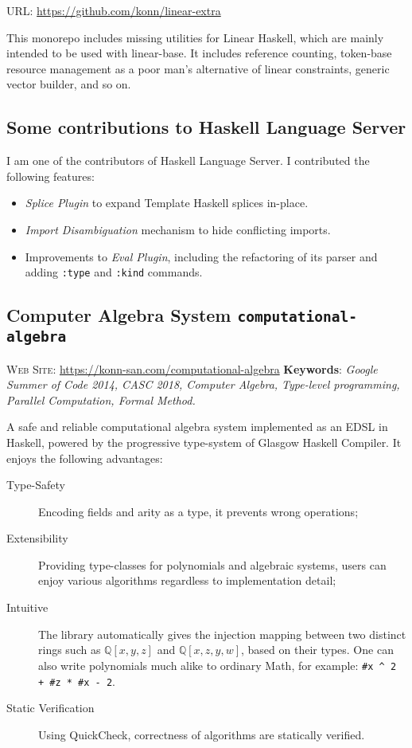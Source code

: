 \documentclass{moderncv}
\begin{document}
URL: \url{https://github.com/konn/linear-extra}

This monorepo includes missing utilities for Linear Haskell, which are mainly intended to be used with linear-base.
It includes reference counting, token-base resource management as a poor man's alternative of linear constraints, generic vector builder, and so on.

\subsection{Some contributions to Haskell Language Server}

I am one of the contributors of Haskell Language Server.
I contributed the following features:

\begin{itemize}
  \item \emph{Splice Plugin} to expand Template Haskell splices in-place.
  \item \emph{Import Disambiguation} mechanism to hide conflicting imports.
  \item Improvements to \emph{Eval Plugin}, including the refactoring of its parser and adding \texttt{:type} and \texttt{:kind} commands.
\end{itemize}

\subsection{Computer Algebra System \texttt{computational-algebra}}
 \vspace{-.5em}\noindent
 \textsc{Web Site}: \url{https://konn-san.com/computational-algebra}\newline
 \textbf{Keywords}: \emph{Google Summer of Code 2014, CASC 2018, Computer Algebra, Type-level programming, Parallel Computation, Formal Method.}

 \vspace{.5em}
 A safe and reliable computational algebra system implemented as an EDSL in Haskell, powered by the progressive type-system of Glasgow Haskell Compiler.
 It enjoys the following advantages:
 \begin{description}
  \item[Type-Safety] Encoding fields and arity as a type, it prevents wrong operations;
  \item[Extensibility] Providing type-classes for polynomials and algebraic systems, users can enjoy various algorithms regardless to implementation detail;
  \item[Intuitive] The library automatically gives the injection mapping between two distinct rings such as $\mathbb{Q}[x, y, z]$ and $\mathbb{Q}[x,z,y, w]$, based on their types.
             One can also write polynomials much alike to ordinary Math, for example: \verb|#x ^ 2 + #z * #x - 2|.
  \item[Static Verification] 
     Using QuickCheck, correctness of algorithms are statically verified.
 \end{description}
\end{document}
